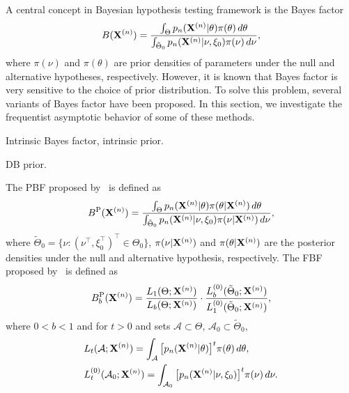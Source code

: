 \documentclass[11pt]{article}
\theoremstyle{plain}
\theoremstyle{definition}
\theoremstyle{remark}
\begin{document}
A central concept in Bayesian hypothesis testing framework is the Bayes factor
\begin{equation*}
    B(\mathbf{X}^{(n)})=
    \frac{\int_{\Theta} p_n(\mathbf{X}^{(n)}|\theta)\pi(\theta)\, d\theta}{\int_{\tilde{\Theta}_0}p_n(\mathbf{X}^{(n)}|\nu,\xi_0)\pi(\nu)\, d\nu},
\end{equation*}
where $\pi(\nu)$ and $\pi(\theta)$ are prior densities of parameters under the null and alternative hypotheses, respectively.
However, it is known that Bayes factor is very sensitive to the choice of prior distribution.
To solve this problem, several variants of Bayes factor have been proposed.
In this section, we investigate the frequentist asymptotic behavior of some of these methods.

Intrinsic Bayes factor, intrinsic prior.

DB prior.


The PBF proposed by~\cite{Aitkin1991Posterior}  is defined as
\begin{equation*}
    B^{\textrm{P}}(\mathbf{X}^{(n)})=
    \frac{\int_{\Theta} p_n(\mathbf{X}^{(n)}|\theta)\pi(\theta|\mathbf{X}^{(n)})\, d\theta}{\int_{\tilde{\Theta}_0}p_n(\mathbf{X}^{(n)}|\nu,\xi_0)\pi(\nu|\mathbf{X}^{(n)})\, d\nu},
\end{equation*}
where
$\tilde{\Theta}_0=\{\nu: (\nu^\top ,\xi_0^\top )^\top \in \Theta_0\}$, $\pi(\nu|\mathbf{X}^{(n)})$ and $\pi(\theta|\mathbf{X}^{(n)})$ are the posterior densities under the null and alternative hypothesis, respectively.
The FBF proposed by~\cite{Fractional1995} is defined as
\begin{equation*}
    B_b^{\textrm{P}}(\mathbf{X}^{(n)})=
    \frac{L_{1}(\Theta;\mathbf{X}^{(n)})}{L_{b}(\Theta;\mathbf{X}^{(n)})}\cdot \frac{L_{b}^{(0)}(\tilde{\Theta}_0;\mathbf{X}^{(n)})}{L_{1}^{(0)}(\tilde{\Theta}_0;\mathbf{X}^{(n)})},
\end{equation*}
where $0<b<1$ and for $t>0$ and sets $\mathcal A\subset \Theta$, $\mathcal A_0\subset \tilde{\Theta}_0$,
\begin{align*}
 &L_t(\mathcal A;\mathbf{X}^{(n)})=\int_{\mathcal A}\big[p_n(\mathbf{X}^{(n)}|\theta)\big]^t \pi(\theta)\, d\theta,\\
 &L_t^{(0)}(\mathcal A_0;\mathbf{X}^{(n)})=\int_{\mathcal A_0}\big[p_n(\mathbf{X}^{(n)}|\nu,\xi_0)\big]^t \pi(\nu)\, d\nu.
\end{align*}
\end{document}
